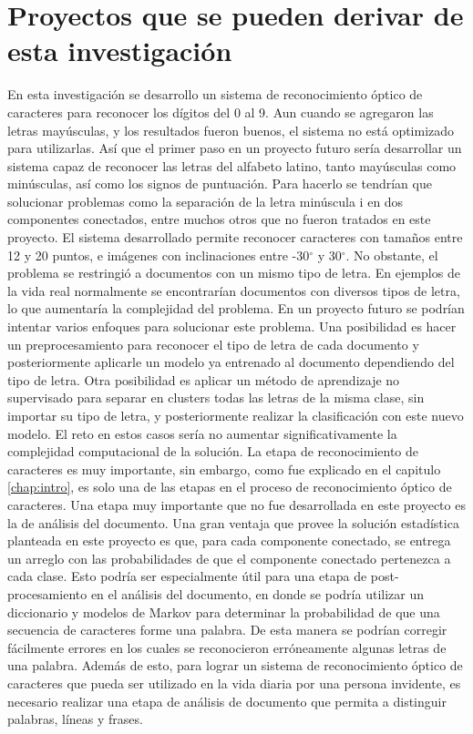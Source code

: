\documentclass[a4paper, 11pt, oneside]{report}
\begin{document}
\section{Proyectos que se pueden derivar de esta investigación}
En esta investigación se desarrollo un sistema de reconocimiento óptico de caracteres para reconocer los dígitos del 0 al 9. Aun cuando se agregaron las letras mayúsculas, y los resultados fueron buenos, el sistema no está optimizado para utilizarlas. Así que el primer paso en un proyecto futuro sería desarrollar un sistema capaz de reconocer las letras del alfabeto latino, tanto mayúsculas como minúsculas, así como los signos de puntuación. Para hacerlo se tendrían que solucionar problemas como la separación de la letra minúscula i en dos componentes conectados, entre muchos otros que no fueron tratados en este proyecto.
El sistema desarrollado permite reconocer caracteres con tamaños entre 12 y 20 puntos, e imágenes con inclinaciones entre -30$^{\circ}$ y 30$^{\circ}$. No obstante, el problema se restringió a documentos con un mismo tipo de letra. En ejemplos de la vida real normalmente se encontrarían documentos con diversos tipos de letra, lo que aumentaría la complejidad del problema. En un proyecto futuro se podrían intentar varios enfoques para solucionar este problema. Una posibilidad es hacer un preprocesamiento para reconocer el tipo de letra de cada documento y posteriormente aplicarle un modelo ya entrenado al documento dependiendo del tipo de letra. Otra posibilidad es aplicar un método de aprendizaje no supervisado para separar en clusters todas las letras de la misma clase, sin importar su tipo de letra, y posteriormente realizar la clasificación con este nuevo modelo. El reto en estos casos sería no aumentar significativamente la complejidad computacional de la solución.
La etapa de reconocimiento de caracteres es muy importante, sin embargo, como fue explicado en el capitulo \ref{chap:intro}, es solo una de las etapas en el proceso de reconocimiento óptico de caracteres. Una etapa muy importante que no fue desarrollada en este proyecto es la de análisis del documento. Una gran ventaja que provee la solución estadística planteada en este proyecto es que, para cada componente conectado, se entrega un arreglo con las probabilidades de que el componente conectado pertenezca a cada clase. Esto podría ser especialmente útil para una etapa de post-procesamiento en el análisis del documento, en donde se podría utilizar un diccionario y modelos de Markov para determinar la probabilidad de que una secuencia de caracteres forme una palabra. De esta manera se podrían corregir fácilmente errores en los cuales se reconocieron erróneamente algunas letras de una palabra. Además de esto, para lograr un sistema de reconocimiento óptico de caracteres que pueda ser utilizado en la vida diaria por una persona invidente, es necesario realizar una etapa de análisis de documento que permita a distinguir palabras, líneas y frases.
\end{document}

